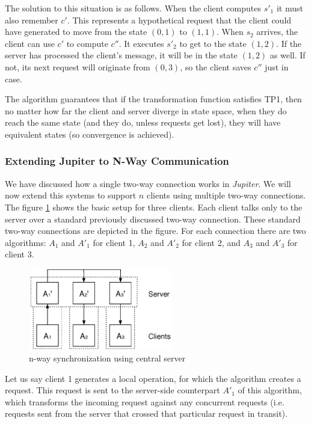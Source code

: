 The solution to this situation is as follows. When the client computes $s'_1$ it 
must also remember $c'$. This represents a hypothetical request that the client 
could have generated to move from the state $(0,1)$ to $(1,1)$. When $s_2$
arrives, the client can use $c'$ to compute $c''$. It executes $s'_2$ to get to 
the state $(1,2)$. If the server has processed the client's message, it will be 
in the state $(1,2)$ as well. If not, its next request will originate from 
$(0,3)$, so the client saves $c''$ just in case.

The algorithm guarantees that if the transformation function satisfies TP1, then no matter how far the client and server diverge in state space, when they do reach the same state (and they do, unless requests get lost), they will have equivalent states (so convergence is achieved).

\subsubsection{Extending Jupiter to N-Way Communication}
We have discussed how a single two-way connection works in \emph{Jupiter}. We will now extend this systems to support $n$ clients using multiple two-way connections. The figure \ref{fig:concepts.nway-details} shows the basic setup for three clients. Each client talks only to the server over a standard previously discussed two-way connection. These standard two-way connections
are depicted in the figure. For each connection there are two algorithms:
$A_1$ and $A'_1$ for client 1, $A_2$ and $A'_2$ for client 2, and $A_3$ and
$A'_3$ for client 3.  

\begin{figure}[htb]
 \centering
 \includegraphics[width=6.31cm,height=3.56cm]{../images/finalreport/concepts_nway-details.eps}
 \caption{n-way synchronization using central server}
 \label{fig:concepts.nway-details}
\end{figure}

Let us say client 1 generates a local operation, for which the algorithm
creates a request. This request is sent to the server-side counterpart $A'_1$ of
this algorithm, which transforms the incoming request against any concurrent
requests (i.e. requests sent from the server that crossed that particular 
request in transit).

